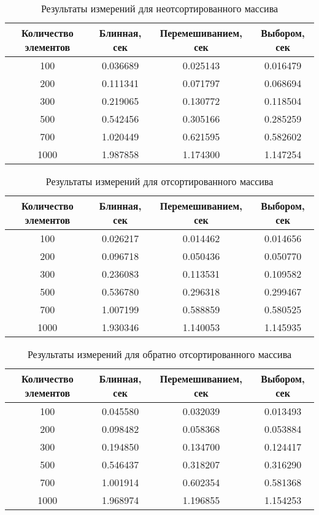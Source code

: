 \begin{table}[h]
	\begin{center}
		\caption{\label{tnsort}Результаты измерений для неотсортированного массива}
		\begin{tabular}{|c|c|c|c|}
			\hline
			Количество элементов & Блинная, сек & Перемешиванием, сек & Выбором, сек \\
			\hline
			100 & 0.036689 & 0.025143 & 0.016479 \\
			\hline
			200 & 0.111341 & 0.071797 & 0.068694 \\
			\hline
			300 & 0.219065 & 0.130772 & 0.118504 \\
			\hline
			500 & 0.542456 & 0.305166 & 0.285259 \\
			\hline
			700 & 1.020449 & 0.621595 & 0.582602 \\
			\hline
			1000 & 1.987858 & 1.174300 & 1.147254 \\
			\hline
		\end{tabular}
	\end{center}
\end{table}
\begin{table}[h]
	\begin{center}
		\caption{\label{tsort}Результаты измерений для отсортированного массива}
		\begin{tabular}{|c|c|c|c|}
			\hline
			Количество элементов & Блинная, сек & Перемешиванием, сек & Выбором, сек \\
			\hline
			100 & 0.026217 & 0.014462 & 0.014656 \\
			\hline
			200 & 0.096718 & 0.050436 & 0.050770 \\
			\hline
			300 & 0.236083 & 0.113531 & 0.109582 \\
			\hline
			500 & 0.536780 & 0.296318 & 0.299467 \\
			\hline
			700 & 1.007199 & 0.588859 & 0.580525 \\
			\hline
			1000 & 1.930346 & 1.140053 & 1.145935 \\
			\hline
		\end{tabular}
	\end{center}
\end{table}
\begin{table}[h]
	\begin{center}
		\caption{\label{trsort}Результаты измерений для обратно отсортированного массива}
		\begin{tabular}{|c|c|c|c|}
			\hline
			Количество элементов & Блинная, сек & Перемешиванием, сек & Выбором, сек \\
			\hline
			100 & 0.045580 & 0.032039 & 0.013493 \\
			\hline
			200 & 0.098482 & 0.058368 & 0.053884 \\
			\hline
			300 & 0.194850 & 0.134700 & 0.124417 \\
			\hline
			500 & 0.546437 & 0.318207 & 0.316290 \\
			\hline
			700 & 1.001914 & 0.602354 & 0.581368 \\
			\hline
			1000 & 1.968974 & 1.196855 & 1.154253 \\
			\hline
		\end{tabular}
	\end{center}
\end{table}

